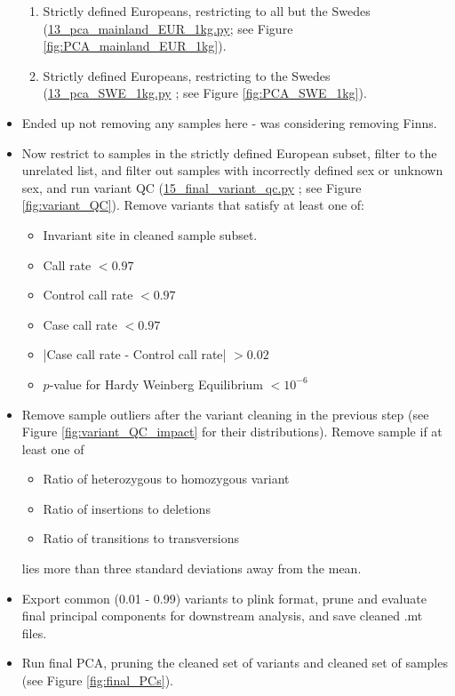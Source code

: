 \documentclass[12pt]{article}
\begin{document}
\begin{itemize}
\begin{enumerate}
		\item Strictly defined Europeans, restricting to all but the Swedes (\href{https://github.com/astheeggeggs/BipEx/blob/master/scripts_Dalio/QC_Dalio/13_pca_mainland_EUR_1kg.py}{13\_pca\_mainland\_EUR\_1kg.py}; see Figure \ref{fig:PCA_mainland_EUR_1kg}).
		\item Strictly defined Europeans, restricting to the Swedes (\href{https://github.com/astheeggeggs/BipEx/blob/master/scripts_Dalio/QC_Dalio/13_pca_SWE_1kg.py}{13\_pca\_SWE\_1kg.py} ; see Figure \ref{fig:PCA_SWE_1kg}).
	\end{enumerate}
	\item Ended up not removing any samples here - was considering removing Finns.
	\item Now restrict to samples in the strictly defined European subset, filter to the unrelated list, and filter out samples with incorrectly defined sex or unknown sex, and run variant QC (\href{https://github.com/astheeggeggs/BipEx/blob/master/scripts_Dalio/QC_Dalio/15_final_variant_qc.py}{15\_final\_variant\_qc.py} ; see Figure \ref{fig:variant_QC}). Remove variants that satisfy at least one of:
	\begin{itemize}
		\item Invariant site in cleaned sample subset.
		\item Call rate $< 0.97$
		\item Control call rate $< 0.97$
		\item Case call rate $< 0.97$
		\item |Case call rate - Control call rate| $> 0.02$
		\item $p$-value for Hardy Weinberg Equilibrium $< 10^{-6}$
	\end{itemize}
	\item Remove sample outliers after the variant cleaning in the previous step (see Figure \ref{fig:variant_QC_impact} for their distributions). Remove sample if at least one of
	\begin{itemize}
		\item Ratio of heterozygous to homozygous variant
		\item Ratio of insertions to deletions
		\item Ratio of transitions to transversions
	\end{itemize} 
	lies more than three standard deviations away from the mean.
	\item Export common (0.01 - 0.99) variants to plink format, prune and evaluate final principal components for downstream analysis, and save cleaned .mt files.
	\item Run final PCA, pruning the cleaned set of variants and cleaned set of samples (see Figure \ref{fig:final_PCs}).
\end{itemize}
\end{document}

